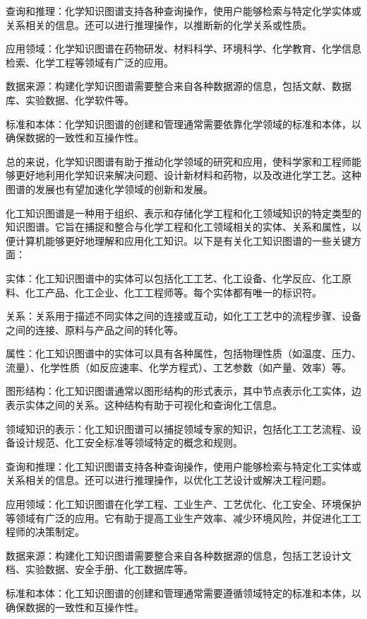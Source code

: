 查询和推理：化学知识图谱支持各种查询操作，使用户能够检索与特定化学实体或关系相关的信息。还可以进行推理操作，以推断新的化学关系或性质。

应用领域：化学知识图谱在药物研发、材料科学、环境科学、化学教育、化学信息检索、化学工程等领域有广泛的应用。

数据来源：构建化学知识图谱需要整合来自各种数据源的信息，包括文献、数据库、实验数据、化学软件等。

标准和本体：化学知识图谱的创建和管理通常需要依靠化学领域的标准和本体，以确保数据的一致性和互操作性。

总的来说，化学知识图谱有助于推动化学领域的研究和应用，使科学家和工程师能够更好地利用化学知识来解决问题、设计新材料和药物，以及改进化学工艺。这种图谱的发展也有望加速化学领域的创新和发展。


化工知识图谱是一种用于组织、表示和存储化学工程和化工领域知识的特定类型的知识图谱。它旨在捕捉和整合与化学工程和化工领域相关的实体、关系和属性，以便计算机能够更好地理解和应用化工知识。以下是有关化工知识图谱的一些关键方面：

实体：化工知识图谱中的实体可以包括化工工艺、化工设备、化学反应、化工原料、化工产品、化工企业、化工工程师等。每个实体都有唯一的标识符。

关系：关系用于描述不同实体之间的连接或互动，如化工工艺中的流程步骤、设备之间的连接、原料与产品之间的转化等。

属性：化工知识图谱中的实体可以具有各种属性，包括物理性质（如温度、压力、流量）、化学性质（如反应速率、化学方程式）、工艺参数（如产量、效率）等。

图形结构：化工知识图谱通常以图形结构的形式表示，其中节点表示化工实体，边表示实体之间的关系。这种结构有助于可视化和查询化工信息。

领域知识的表示：化工知识图谱可以捕捉领域专家的知识，包括化工工艺流程、设备设计规范、化工安全标准等领域特定的概念和规则。

查询和推理：化工知识图谱支持各种查询操作，使用户能够检索与特定化工实体或关系相关的信息。还可以进行推理操作，以优化工艺设计或解决工程问题。

应用领域：化工知识图谱在化学工程、工业生产、工艺优化、化工安全、环境保护等领域有广泛的应用。它有助于提高工业生产效率、减少环境风险，并促进化工工程师的决策制定。

数据来源：构建化工知识图谱需要整合来自各种数据源的信息，包括工艺设计文档、实验数据、安全手册、化工数据库等。

标准和本体：化工知识图谱的创建和管理通常需要遵循领域特定的标准和本体，以确保数据的一致性和互操作性。

